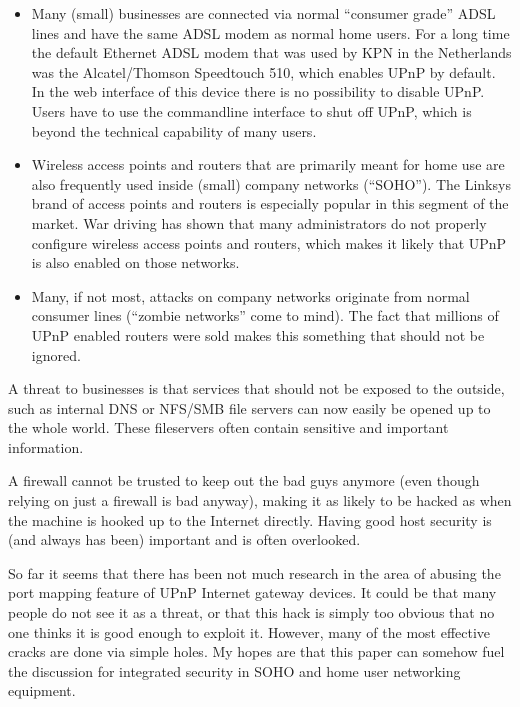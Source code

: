 \documentclass[10pt]{article}
\begin{document}
\begin{itemize}
\item Many (small) businesses are connected via normal ``consumer grade'' ADSL
lines and have the same ADSL modem as normal home users. For a long time the
default Ethernet ADSL modem that was used by KPN in the Netherlands was the
Alcatel/Thomson Speedtouch 510, which enables UPnP by default. In the web
interface of this device there is no possibility to disable UPnP. Users have
to use the commandline interface to shut off UPnP, which is beyond the
technical capability of many users.

\item Wireless access points and routers that are primarily meant for home
use are also frequently used inside (small) company networks (``SOHO'').
The Linksys brand of access points and routers is especially popular in
this segment of the market. War driving has shown that many administrators do not
properly configure wireless access points and routers, which makes it likely
that UPnP is also enabled on those networks.

\item Many, if not most, attacks on company networks originate from normal
consumer lines (``zombie networks'' come to mind). The fact that millions of
UPnP enabled routers were sold makes this something that should not be
ignored.

\end{itemize}

A threat to businesses is that services that should not be exposed to the
outside, such as internal DNS or NFS/SMB file servers can now easily be opened
up to the whole world. These fileservers often contain sensitive and important
information.

A firewall cannot be trusted to keep out the bad guys anymore (even though
relying on just a firewall is bad anyway), making it as likely to be hacked
as when the machine is hooked up to the Internet directly. Having good host
security is (and always has been) important and is often overlooked.

So far it seems that there has been not much research in the area of abusing
the port mapping feature of UPnP Internet gateway devices. It could be that
many people do not see it as a threat, or that this hack is simply too obvious
that no one thinks it is good enough to exploit it. However, many of the most
effective cracks are done via simple holes. My hopes are that this paper
can somehow fuel the discussion for integrated security in SOHO and
home user networking equipment.
\end{document}
